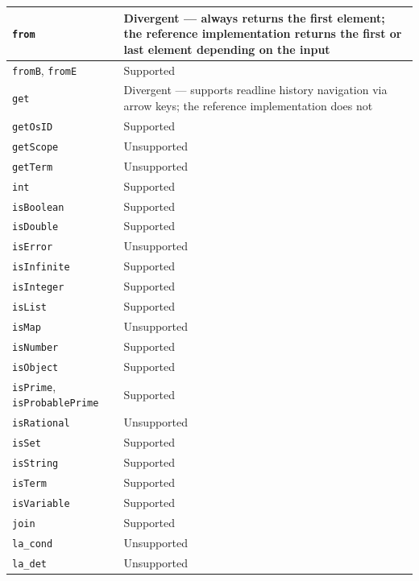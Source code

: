 \begin{longtable}{|p{4cm}|p{9cm}|}
        \hline
        \texttt{from} & Divergent --- always returns the first element; the reference implementation returns the first or last element depending on the input \\
        \hline
        \texttt{fromB}, \texttt{fromE} & Supported \\
        \hline
        \texttt{get} & Divergent --- supports readline history navigation via arrow keys; the reference implementation does not \\
        \hline
        \texttt{getOsID} & Supported \\
        \hline
        \texttt{getScope} & Unsupported \\
        \hline
        \texttt{getTerm} & Unsupported \\
        \hline
        \texttt{int} & Supported \\
        \hline
        \texttt{isBoolean} & Supported \\
        \hline
        \texttt{isDouble} & Supported \\
        \hline
        \texttt{isError} & Unsupported \\
        \hline
        \texttt{isInfinite} & Supported \\
        \hline
        \texttt{isInteger} & Supported \\
        \hline
        \texttt{isList} & Supported \\
        \hline
        \texttt{isMap} & Unsupported \\
        \hline
        \texttt{isNumber} & Supported \\
        \hline
        \texttt{isObject} & Supported \\
        \hline
        \texttt{isPrime}, \texttt{isProbablePrime} & Supported \\
        \hline
        \texttt{isRational} & Unsupported \\
        \hline
        \texttt{isSet} & Supported \\
        \hline
        \texttt{isString} & Supported \\
        \hline
        \texttt{isTerm} & Supported \\
        \hline
        \texttt{isVariable} & Supported \\
        \hline
        \texttt{join} & Supported \\
        \hline
        \texttt{la\_cond} & Unsupported \\
        \hline
        \texttt{la\_det} & Unsupported \\

\end{longtable}
